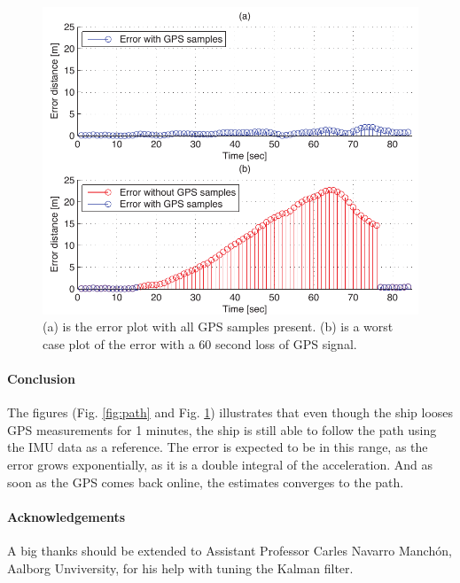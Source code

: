 \documentclass[a0,portrait]{a0poster}
\begin{document}
\begin{center}
{\begin{figure}
	\centering %
	\includegraphics[width=\threecolwidth]{img/error}
  	\caption{(a) is the error plot with all GPS samples present. (b) is a worst case plot of the error with a 60 second loss of GPS signal.}
	\label{fig:error}
\end{figure}


\paragraph{Conclusion}
The figures (Fig. \ref{fig:path} and Fig. \ref{fig:error}) illustrates that even though the ship looses GPS measurements for 1 minutes, the ship is still able to follow the path using the IMU data as a reference. The error is expected to be in this range, as the error grows exponentially, as it is a double integral of the acceleration. And as soon as the GPS comes back online, the estimates converges to the path.

\paragraph{Acknowledgements} A big thanks should be extended to Assistant Professor Carles Navarro Manchón, Aalborg Unviversity, for his help with tuning the Kalman filter. 


}
\end{center}

\makefooter
\end{document}
